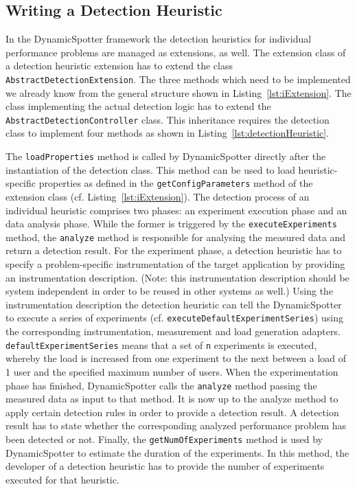 \documentclass{report}
\newcommand{\DS}{DynamicSpotter }
\begin{document}
\subsection{Writing a Detection Heuristic}
In the \DS framework the detection heuristics for individual performance problems are managed as extensions, as well.
The extension class of a detection heuristic extension has to extend the class \texttt{AbstractDetectionExtension}. 
The three methods which need to be implemented we already know from the general structure shown in
Listing~\ref{lst:iExtension}. The class implementing the actual detection logic has to extend the
\texttt{AbstractDetectionController} class. This inheritance requires the detection class to implement four methods as
shown in Listing~\ref{lst:detectionHeuristic}.

The \texttt{loadProperties} method is called by \DS directly after the instantiation of the detection class. This method
can be used to load heuristic-specific properties as defined in the \texttt{getConfigParameters} method of the extension
class (cf. Listing~\ref{lst:iExtension}). The detection process of an individual heuristic comprises two phases: an
experiment execution phase and an data analysis phase. While the former is triggered by the \texttt{executeExperiments}
method, the \texttt{analyze} method is responsible for analysing the measured data and return a detection result.
For the experiment phase, a detection heuristic has to specify a problem-specific instrumentation of the target
application by providing an instrumentation description. (Note: this instrumentation description should be system
independent in order to be reused in other systems as well.) Using the instrumentation description the detection
heuristic can tell the \DS to execute a series of experiments (cf. \texttt{executeDefaultExperimentSeries}) using the
corresponding instrumentation, measurement and load generation adapters. \texttt{defaultExperimentSeries} means that a
set of \texttt{n} experiments is executed, whereby the load is increased from one experiment to the next between a load
of 1 user and the specified maximum number of users. When the experimentation phase has finished, \DS calls the
\texttt{analyze} method passing the measured data as input to that method. It is now up to the analyze method to apply
certain detection rules in order to provide a detection result. A detection result has to state whether the
corresponding analyzed performance problem has been detected or not.
Finally, the \texttt{getNumOfExperiments} method is used by \DS to estimate the duration of the experiments. In this
method, the developer of a detection heuristic has to provide the number of experiments executed for that heuristic.
\end{document}
